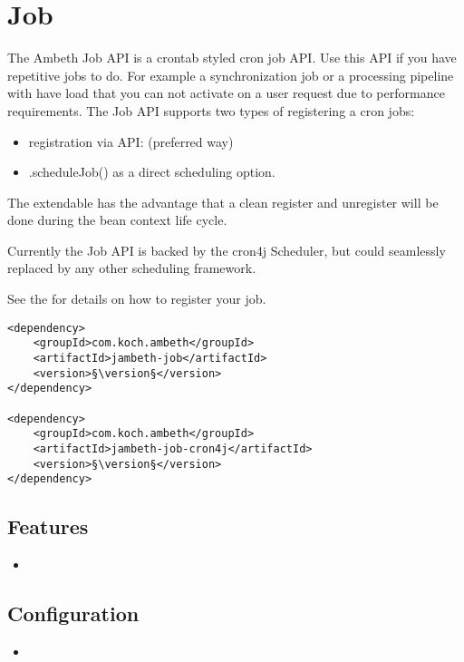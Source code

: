 \section{Job}
\label{module:Job}
\ClearAPI
The Ambeth Job API is a crontab styled cron job API. Use this API if you have repetitive jobs to do. For example a synchronization job or a processing pipeline with have load that you can not activate on a user request due to performance requirements. The Job API supports two types of registering a cron jobs:

\begin{itemize}
	\item registration via  API:  (preferred way)
	\item {}.scheduleJob() as a direct scheduling option.
\end{itemize}

The extendable has the advantage that a clean register and unregister will be done during the bean context life cycle.

Currently the Job API is backed by the cron4j Scheduler, but could seamlessly replaced by any other scheduling framework. 

See the  for details on how to register your job.

\begin{lstlisting}[style=POM,caption={Maven modules to use \emph{Ambeth Job}}]
<dependency>
	<groupId>com.koch.ambeth</groupId>
	<artifactId>jambeth-job</artifactId>
	<version>§\version§</version>
</dependency>

<dependency>
	<groupId>com.koch.ambeth</groupId>
	<artifactId>jambeth-job-cron4j</artifactId>
	<version>§\version§</version>
</dependency>
\end{lstlisting}
\subsection{Features}
\begin{itemize}
	\item {}
\end{itemize}

\subsection{Configuration}
\begin{itemize}
	\item {}
\end{itemize}
